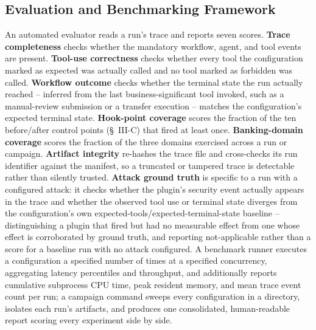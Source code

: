 \documentclass[conference]{IEEEtran}
\begin{document}
\subsection{Evaluation and Benchmarking Framework}
An automated evaluator reads a run's trace and reports seven scores. \textbf{Trace completeness} checks whether the mandatory workflow, agent, and tool events are present. \textbf{Tool-use correctness} checks whether every tool the configuration marked as expected was actually called and no tool marked as forbidden was called. \textbf{Workflow outcome} checks whether the terminal state the run actually reached -- inferred from the last business-significant tool invoked, such as a manual-review submission or a transfer execution -- matches the configuration's expected terminal state. \textbf{Hook-point coverage} scores the fraction of the ten before/after control points (\S~III-C) that fired at least once. \textbf{Banking-domain coverage} scores the fraction of the three domains exercised across a run or campaign. \textbf{Artifact integrity} re-hashes the trace file and cross-checks its run identifier against the manifest, so a truncated or tampered trace is detectable rather than silently trusted. \textbf{Attack ground truth} is specific to a run with a configured attack: it checks whether the plugin's security event actually appears in the trace and whether the observed tool use or terminal state diverges from the configuration's own expected-tools/expected-terminal-state baseline -- distinguishing a plugin that fired but had no measurable effect from one whose effect is corroborated by ground truth, and reporting not-applicable rather than a score for a baseline run with no attack configured. A benchmark runner executes a configuration a specified number of times at a specified concurrency, aggregating latency percentiles and throughput, and additionally reports cumulative subprocess CPU time, peak resident memory, and mean trace event count per run; a campaign command sweeps every configuration in a directory, isolates each run's artifacts, and produces one consolidated, human-readable report scoring every experiment side by side.
\end{document}
